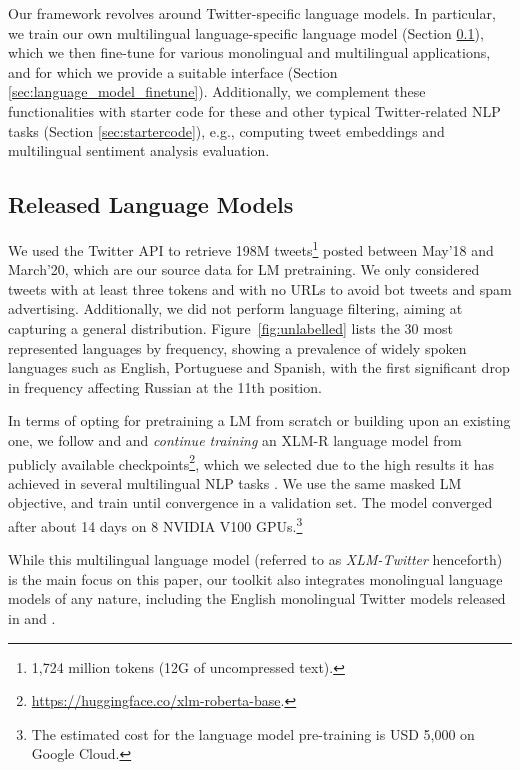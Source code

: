 \documentclass[10pt, a4paper]{article}
\begin{document}
Our framework revolves around Twitter-specific language models. In particular, we train our own multilingual language-specific language model (Section \ref{sec:language_model_pret}), which we then fine-tune for various monolingual and multilingual applications, and for which we provide a suitable interface (Section \ref{sec:language_model_finetune}). Additionally, we complement these functionalities with starter code for these and other typical Twitter-related NLP tasks (Section \ref{sec:startercode}), e.g., computing tweet embeddings and multilingual sentiment analysis evaluation. 

\subsection{Released Language Models}
\label{sec:language_model_pret}








We used the Twitter API to retrieve 198M tweets\footnote{1,724 million tokens (12G of uncompressed text).} posted between May'18 and March'20, which are our source data for LM pretraining.
We only considered tweets with at least three tokens and with no URLs to avoid bot tweets and spam advertising. Additionally, we did not perform language filtering, aiming at capturing a general distribution. Figure~\ref{fig:unlabelled} lists the 30 most represented languages by frequency, showing a prevalence of widely spoken languages such as English, Portuguese and Spanish, with the first significant drop in frequency affecting Russian at the 11th position. 


In terms of opting for pretraining a LM from scratch or building upon an existing one, we follow \cite{gururangan-etal-2020-dont} and \cite{barbieri-etal-2020-tweeteval} and \textit{continue training} an XLM-R language model from publicly available checkpoints\footnote{\url{https://huggingface.co/xlm-roberta-base}.}, which we selected due to the high results it has achieved in several multilingual NLP tasks \cite{hu2020xtreme}. We use the same masked LM objective, and train until convergence in a validation set. The model converged after about 14 days on 8 NVIDIA V100 GPUs.\footnote{The estimated cost for the language model pre-training is USD 5,000 on Google Cloud.}

While this multilingual language model (referred to as \textit{XLM-Twitter} henceforth) is the main focus on this paper, our toolkit also integrates monolingual language models of any nature, including the English monolingual Twitter models released in  and .
\end{document}
